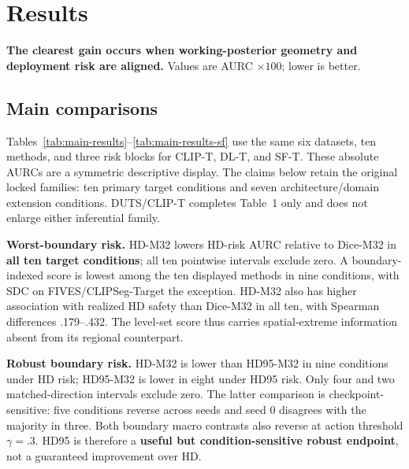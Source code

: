 \section{Results}
\label{sec:results}

\textbf{The clearest gain occurs when working-posterior geometry and deployment
risk are aligned.} Values
are AURC \(\times100\); lower is better.

\subsection{Main comparisons}


Tables~\ref{tab:main-results}--\ref{tab:main-results-sf} use the same six
datasets, ten methods, and three risk blocks for CLIP-T, DL-T, and SF-T. These
absolute AURCs are a symmetric descriptive display. The claims below retain the
original locked families: ten primary target conditions and seven
architecture/domain extension conditions. DUTS/CLIP-T completes Table~1 only
and does not enlarge either inferential family.

\noindent\textbf{Worst-boundary risk.}
HD-M32 lowers HD-risk AURC relative to Dice-M32 in \textbf{all ten target conditions};
all ten pointwise intervals exclude zero. A boundary-indexed score is lowest
among the ten displayed methods in nine conditions, with SDC on
FIVES/CLIPSeg-Target the exception. HD-M32 also has higher association with
realized HD safety than Dice-M32 in all ten, with Spearman differences
.179--.432. The level-set score thus carries spatial-extreme information absent
from its regional counterpart.

\noindent\textbf{Robust boundary risk.}
HD-M32 is lower than HD95-M32 in nine conditions under HD risk; HD95-M32 is
lower in eight under HD95 risk. Only four and two matched-direction intervals
exclude zero. The latter comparison is checkpoint-sensitive: five conditions
reverse across seeds and seed 0 disagrees with the majority in three. Both
boundary macro contrasts also reverse at action threshold \(\gamma=.3\). HD95
is therefore a \textbf{useful but condition-sensitive robust endpoint}, not a guaranteed
improvement over HD.

